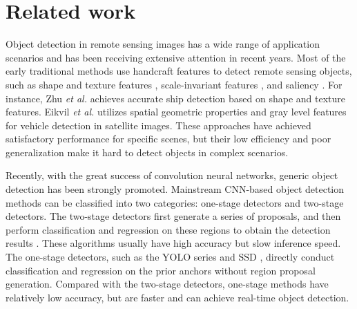 \documentclass[journal]{IEEEtran}
\begin{document}
\section{Related work}
Object detection in remote sensing images  has a wide range of application scenarios and has been receiving extensive attention in recent years. Most of the early traditional methods  use handcraft features to detect remote sensing objects, such as shape and texture features \cite{li2012automatic, zhu2010novel, eikvil2009classification}, scale-invariant features \cite{han2014efficient}, and saliency \cite{han2014object}. For instance, Zhu \textit{et al.} \cite{zhu2010novel} achieves accurate ship detection based on shape and texture features. Eikvil \textit{et al.} \cite{eikvil2009classification} utilizes spatial geometric properties and gray level features for vehicle detection in satellite images. These approaches have achieved satisfactory performance for specific scenes, but their low efficiency and poor generalization make it hard to detect objects in complex scenarios. 

Recently, with the great success of convolution neural networks, generic object detection has been strongly promoted. Mainstream CNN-based object detection methods can be classified into two categories: one-stage detectors and two-stage detectors. The two-stage detectors first generate a series of proposals, and then perform classification and regression on these regions to obtain the detection results \cite{girshick2014rich, girshick2015fast, ren2015faster}. These algorithms usually have high accuracy but slow inference speed. The one-stage detectors, such as the YOLO series \cite{redmon2016you, redmon2017yolo9000, redmon2018yolov3} and SSD \cite{liu2016ssd}, directly conduct classification and regression on the prior anchors without region proposal generation. Compared with the two-stage detectors, one-stage methods have relatively low accuracy, but are faster and can achieve real-time object detection.
\end{document}
